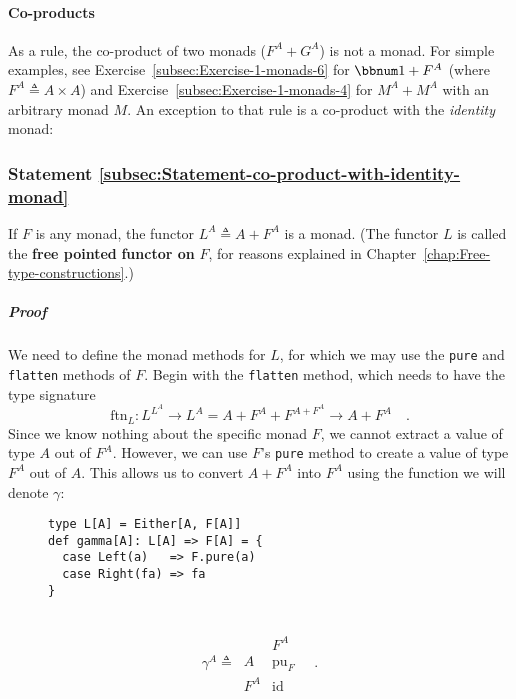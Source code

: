 \paragraph{Co-products}

As a rule, the co-product of two monads ($F^{A}+G^{A}$) is not a
monad. For simple examples, see Exercise~\ref{subsec:Exercise-1-monads-6}
for $\bbnum 1+F^{A}$ (where $F^{A}\triangleq A\times A$) and Exercise~\ref{subsec:Exercise-1-monads-4}
for $M^{A}+M^{A}$ with an arbitrary monad $M$. An exception to that
rule is a co-product with the \emph{identity} monad:

\subsubsection{Statement \label{subsec:Statement-co-product-with-identity-monad}\ref{subsec:Statement-co-product-with-identity-monad}}

If $F$ is any monad, the functor $L^{A}\triangleq A+F^{A}$ is a
monad. (The functor $L$ is called the \textbf{free pointed}
\textbf{functor on} $F$, for reasons explained in Chapter~\ref{chap:Free-type-constructions}.)

\subparagraph{Proof}

We need to define the monad methods for $L$, for which we may use
the \lstinline!pure! and \lstinline!flatten! methods of $F$. Begin
with the \lstinline!flatten! method, which needs to have the type
signature
\[
\text{ftn}_{L}:L^{L^{A}}\rightarrow L^{A}=A+F^{A}+F^{A+F^{A}}\rightarrow A+F^{A}\quad.
\]
Since we know nothing about the specific monad $F$, we cannot extract
a value of type $A$ out of $F^{A}$. However, we can use $F$\textsf{'}s \lstinline!pure!
method to create a value of type $F^{A}$ out of $A$. This allows
us to convert $A+F^{A}$ into $F^{A}$ using the function we will
denote $\gamma$:

\begin{wrapfigure}{l}{0.55\columnwidth}%
\vspace{-0.8\baselineskip}
\begin{lstlisting}
type L[A] = Either[A, F[A]]
def gamma[A]: L[A] => F[A] = {
  case Left(a)   => F.pure(a)
  case Right(fa) => fa
}
\end{lstlisting}

\vspace{-2\baselineskip}
\end{wrapfigure}%

~\vspace{-0.2\baselineskip}
\[
\gamma^{A}\triangleq\,\begin{array}{|c||c|}
 & F^{A}\\
\hline A & \text{pu}_{F}\\
F^{A} & \text{id}
\end{array}\quad.
\]

